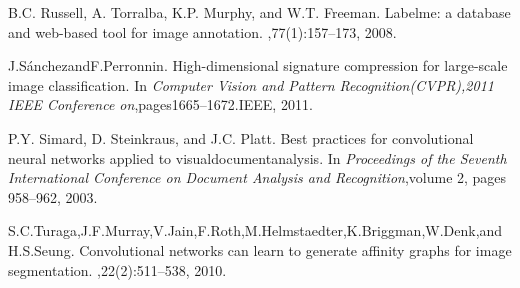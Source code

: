 \documentclass[12pt]{article}
\begin{document}
\begin{CJK*}{UTF8}{gkai}
\begin{thebibliography}{1}
B.C. Russell, A. Torralba, K.P. Murphy, and W.T. Freeman.  
\newblock Labelme: a database and web-based tool for image annotation.
,77(1):157–173, 2008.

J.SánchezandF.Perronnin.  
\newblock High-dimensional signature compression for large-scale image classification.
\newblock In {\em Computer Vision and Pattern Recognition(CVPR),2011 IEEE Conference on},pages1665–1672.IEEE, 2011. 
 
P.Y. Simard, D. Steinkraus, and J.C. Platt.   
\newblock Best practices for convolutional neural networks applied to visualdocumentanalysis. 
\newblock In {\em Proceedings of the Seventh International Conference on Document Analysis and Recognition},volume 2, pages 958–962, 2003.

S.C.Turaga,J.F.Murray,V.Jain,F.Roth,M.Helmstaedter,K.Briggman,W.Denk,andH.S.Seung.  
\newblock  Convolutional networks can learn to generate affinity graphs for image segmentation. 
,22(2):511–538, 2010.



\end{thebibliography}

\end{CJK*}
\end{document}

